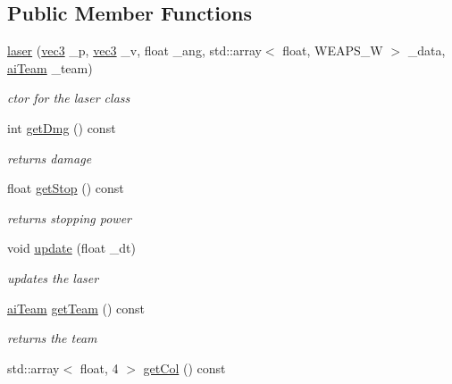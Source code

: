 \subsection*{Public Member Functions}
\begin{DoxyCompactItemize}
\item 
\hyperlink{classlaser_a1abd02fb58a2910ced3e4f0a17abe5bd}{laser} (\hyperlink{structvec3}{vec3} \-\_\-p, \hyperlink{structvec3}{vec3} \-\_\-v, float \-\_\-ang, std\-::array$<$ float, W\-E\-A\-P\-S\-\_\-\-W $>$ \-\_\-data, \hyperlink{enemy_8hpp_abac1fdbabb5a6be5f0d6ae40be5c5a58}{ai\-Team} \-\_\-team)
\begin{DoxyCompactList}\small\item\em ctor for the laser class \end{DoxyCompactList}\item 
\hypertarget{classlaser_a56ca50fb28973ec2025acb23c838b946}{int \hyperlink{classlaser_a56ca50fb28973ec2025acb23c838b946}{get\-Dmg} () const }\label{classlaser_a56ca50fb28973ec2025acb23c838b946}

\begin{DoxyCompactList}\small\item\em returns damage \end{DoxyCompactList}\item 
\hypertarget{classlaser_ad3291de2cda3b474646f6bb4828b0593}{float \hyperlink{classlaser_ad3291de2cda3b474646f6bb4828b0593}{get\-Stop} () const }\label{classlaser_ad3291de2cda3b474646f6bb4828b0593}

\begin{DoxyCompactList}\small\item\em returns stopping power \end{DoxyCompactList}\item 
void \hyperlink{classlaser_a43ea4522e0aa950cb9aeaacc5555562c}{update} (float \-\_\-dt)
\begin{DoxyCompactList}\small\item\em updates the laser \end{DoxyCompactList}\item 
\hypertarget{classlaser_afcebdadf90172d4b3d9e5c98690cbd9d}{\hyperlink{enemy_8hpp_abac1fdbabb5a6be5f0d6ae40be5c5a58}{ai\-Team} \hyperlink{classlaser_afcebdadf90172d4b3d9e5c98690cbd9d}{get\-Team} () const }\label{classlaser_afcebdadf90172d4b3d9e5c98690cbd9d}

\begin{DoxyCompactList}\small\item\em returns the team \end{DoxyCompactList}\item 
\hypertarget{classlaser_a9f267e7172d09b4c8964e2b395de9564}{std\-::array$<$ float, 4 $>$ \hyperlink{classlaser_a9f267e7172d09b4c8964e2b395de9564}{get\-Col} () const }\label{classlaser_a9f267e7172d09b4c8964e2b395de9564}


\end{DoxyCompactItemize}

